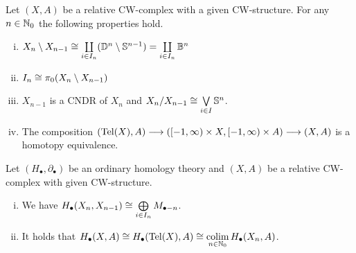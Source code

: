 	\begin{lemma}
		Let $(X,A)$ be a relative CW-complex with a given CW-structure. For any $n \in \mathbb{N}_0$ the following properties hold. 
		\begin{enumerate}[(i)]
			\item{
				$X_n \setminus X_{n-1} \cong \coprod \limits_{i \in I_n} (\mathbb{D}^n \setminus \mathbb{S}^{n-1}) = \coprod \limits_{i \in I_n} \mathbb{B}^n$
			}
			\item{
				$I_n \cong \pi_0(X_n \setminus X_{n-1})$
			}
			\item{
				$X_{n-1}$ is a CNDR of $X_n$ and $X_n / X_{n-1} \cong \operatorname*{\bigvee} \limits_{i \in I} \mathbb{S}^n$.

			}
			\item{
				The composition $(\operatorname{Tel}(X),A) --> ([-1,\infty)\times X,[-1,\infty)\times A) --> (X,A)$ is a homotopy equivalence.
			}
		\end{enumerate}
	\end{lemma}

	\begin{corollary}
		Let $(H_\bullet, \partial_\bullet)$ be an ordinary homology theory and $(X,A)$ be a relative CW-complex with given CW-structure.
		\begin{enumerate}[(i)]
			\item{
				We have $H_\bullet(X_n,X_{n-1}) \cong \bigoplus \limits_{i \in I_n}M_{\bullet-n}$.%
			}
			\item{
				It holds that $H_\bullet(X,A) \cong H_\bullet(\operatorname{Tel} (X), A) \cong \operatorname*{colim} \limits_{n \in \mathbb{N}_0} H_\bullet(X_n,A)$.
			}
		\end{enumerate}
	\end{corollary}


